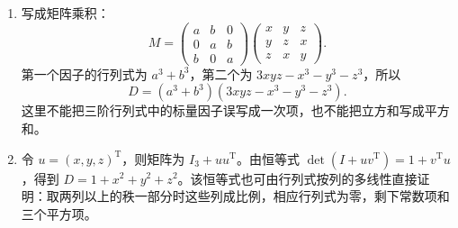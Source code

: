 \documentclass[UTF8,12pt,a4paper,fontset=fandol]{ctexart}
\begin{document}
\begin{solve}
\begin{enumerate}
\item 写成矩阵乘积：
\[M=\begin{pmatrix}a&b&0\\0&a&b\\b&0&a\end{pmatrix}\begin{pmatrix}x&y&z\\y&z&x\\z&x&y\end{pmatrix}.\]
第一个因子的行列式为 $a^3+b^3$，第二个为 $3xyz-x^3-y^3-z^3$，所以
\[D=(a^3+b^3)(3xyz-x^3-y^3-z^3).\]
这里不能把三阶行列式中的标量因子误写成一次项，也不能把立方和写成平方和。
\item 令 $u=(x,y,z)^{\mathrm T}$，则矩阵为 $I_3+uu^{\mathrm T}$。由恒等式 $\det(I+uv^{\mathrm T})=1+v^{\mathrm T}u$，得到 $D=1+x^2+y^2+z^2$。该恒等式也可由行列式按列的多线性直接证明：取两列以上的秩一部分时这些列成比例，相应行列式为零，剩下常数项和三个平方项。\end{enumerate}
\end{solve}
\end{document}
